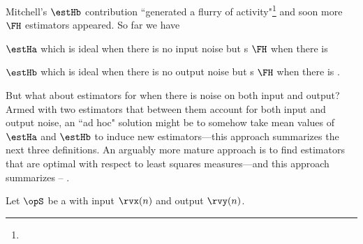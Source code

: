 Mitchell's $\estHb$ contribution ``generated a flurry of activity"\footnote{}
and soon more $\FH$ estimators appeared.
So far we have
\begin{listi}
  \item $\estHa$ which is ideal when there is no input noise but
        s $\FH$ when there is 
  \item $\estHb$ which is ideal when there is no output noise but
        s $\FH$ when there is .
\end{listi}
But what about estimators for when there is noise on both input and output?
Armed with two estimators that between them account for both input and output noise,
an ``ad hoc" solution might be to somehow take mean values of $\estHa$ and $\estHb$
to induce new estimators---this approach summarizes the next three definitions.
An arguably more mature approach is to find estimators that are optimal with respect to least squares measures---and
this approach summarizes  -- .

\begin{definition}
\label{def:Ham}
Let $\opS$ be a  with input $\rvx(n)$ and output $\rvy(n)$.
\end{definition}

